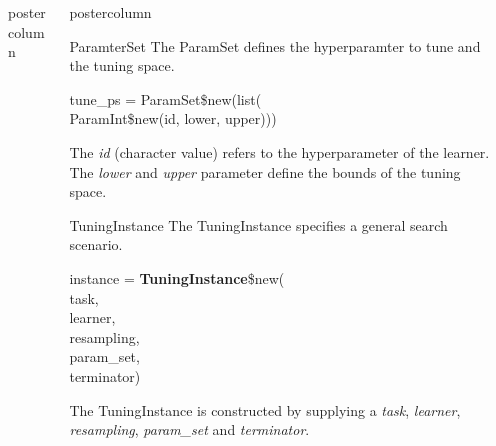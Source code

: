 \documentclass{beamer}
\newlength{\columnheight} %
\begin{document}
\begin{frame}[fragile]{}
\begin{columns}
\begin{column}{.245\textwidth}
\begin{beamercolorbox}[center]{postercolumn}
			\end{beamercolorbox}
		\end{column}
		\begin{column}{.245\textwidth}
			\begin{beamercolorbox}[center]{postercolumn}
				\begin{minipage}{.98\textwidth}
					\parbox[t][\columnheight]{\textwidth}{
						\begin{myblock}{ParamterSet}
						The ParamSet defines the hyperparamter to tune and the tuning space.
							\\
							\begin{codeboxmultiline}[width=18cm]
							tune\_ps = ParamSet\$new(list(\\
							\hspace*{1ex}ParamInt\$new(id, lower, upper)))
						\end{codeboxmultiline}
					The \textit{id} (character value) refers to the hyperparameter of the learner. The \textit{lower} and \textit{upper} parameter define the bounds of the tuning space. 	
						\end{myblock}	
					\begin{myblock}{TuningInstance}
						The TuningInstance specifies a general search scenario.
						\\
						\begin{codeboxmultiline}[width=18cm]
							instance = \textbf{TuningInstance}\$new(\\
							\hspace*{1ex}task,\\
							\hspace*{1ex}learner,\\
							\hspace*{1ex}resampling,\\
							\hspace*{1ex}param\_set,\\
							\hspace*{1ex}terminator)
						\end{codeboxmultiline}
						The TuningInstance is constructed by supplying a \textit{task}, \textit{learner}, \textit{resampling}, \textit{param\_set} and \textit{terminator}. 
						\\
					\end{myblock}	
					\vfill}
				\end{minipage}
			\end{beamercolorbox}
		\end{column}
		\begin{column}{.245\textwidth}

\end{column}
\end{columns}
\end{frame}
\end{document}
